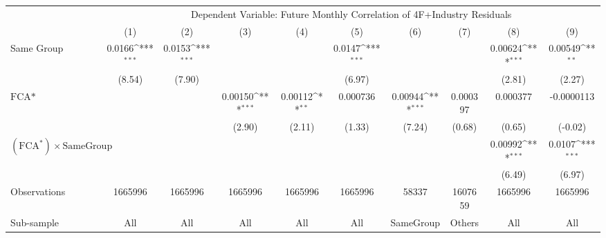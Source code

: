 {
\def\sym#1{\ifmmode^{#1}\else\(^{#1}\)\fi}
\begin{tabular}{l*{9}{c}}
\hline\hline
                &\multicolumn{9}{c}{Dependent Variable: Future Monthly Correlation of 4F+Industry Residuals}                                                                               \\\cmidrule(lr){2-10}
                &\multicolumn{1}{c}{(1)}         &\multicolumn{1}{c}{(2)}         &\multicolumn{1}{c}{(3)}         &\multicolumn{1}{c}{(4)}         &\multicolumn{1}{c}{(5)}         &\multicolumn{1}{c}{(6)}         &\multicolumn{1}{c}{(7)}         &\multicolumn{1}{c}{(8)}         &\multicolumn{1}{c}{(9)}         \\
\hline
Same Group      &   0.0166\sym{***}&   0.0153\sym{***}&                  &                  &   0.0147\sym{***}&                  &                  &  0.00624\sym{***}&  0.00549\sym{**} \\
                &   (8.54)         &   (7.90)         &                  &                  &   (6.97)         &                  &                  &   (2.81)         &   (2.27)         \\
[1em]
$ \text{FCA*} $ &                  &                  &  0.00150\sym{***}&  0.00112\sym{**} & 0.000736         &  0.00944\sym{***}& 0.000397         & 0.000377         &-0.0000113         \\
                &                  &                  &   (2.90)         &   (2.11)         &   (1.33)         &   (7.24)         &   (0.68)         &   (0.65)         &  (-0.02)         \\
[1em]
 $ (\text{FCA}^*) \times {\text{SameGroup} }  $ &                  &                  &                  &                  &                  &                  &                  &  0.00992\sym{***}&   0.0107\sym{***}\\
                &                  &                  &                  &                  &                  &                  &                  &   (6.49)         &   (6.97)         \\
\hline
Observations    &  1665996         &  1665996         &  1665996         &  1665996         &  1665996         &    58337         &  1607659         &  1665996         &  1665996         \\
Sub-sample      &      All         &      All         &      All         &      All         &      All         &SameGroup         &   Others         &      All         &      All         \\

\end{tabular}}
